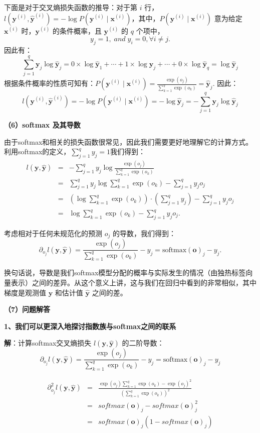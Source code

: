\documentclass[UTF8]{ctexart}
\begin{document}
	下面是对于交叉熵损失函数的推导：对于第 $i$ 行，$ l(\bm{y}^{(i)}, \hat{\bm{y}}^{(i)}) = -\log P(\bm{y}^{(i)} \mid \bm{x}^{(i)}) $，其中，$P(\bm{y}^{(i)} \mid \bm{x}^{(i)})$ 意为给定 $\bm{x}^{(i)}$ 时，$\bm{y}^{(i)}$ 的条件概率，且 $\bm{y}^{(i)}$ 的 $q$ 个项中，
	\[
	y_j=1, \;and \;  y_i=0,\forall i \neq j.
	\]
	因此有：
	\[
	\sum_{j=1}^q \bm{y}_j \log \hat{\bm{y}}_j = 0 \times \log \hat{\bm{y}}_1 + \cdots + 1 \times \log \hat{\bm{y}}_j + \cdots + 0 \times \log \hat{\bm{y}}_q= \log \hat{\bm{y}}_j
	\]
	根据条件概率的性质可知有：$ P(\bm{y}^{(i)} \mid \bm{x}^{(i)}) = \frac{\exp(o_j)}{\sum_{k=1}^q \exp(o_k)} = \hat{\bm{y}}_j$. 因此：
	\[
	l(\bm{y}^{(i)}, \hat{\bm{y}}^{(i)}) = -\log P(\bm{y}^{(i)} \mid \bm{x}^{(i)}) = -\log \hat{\bm{y}}_j = -\sum_{j=1}^q \bm{y}_j \log \hat{\bm{y}}_j
	\]
	
	\textbf{（6）softmax 及其导数}
	
	由于softmax和相关的损失函数很常见，因此我们需要更好地理解它的计算方式。利用softmax的定义，$\sum_{j=1}^q y_j=1$我们得到：
	\begin{eqnarray*}
		l(\bm{y}, \hat{\bm{y}}) &=& -\sum_{j=1}^q y_j \log \frac{\exp(o_j)}{\sum_{k=1}^q \exp(o_k)}\\
		&=& \sum_{j=1}^q y_j \log \sum_{k=1}^q \exp(o_k) - \sum_{j=1}^q y_j o_j\\
		&=& \left(\log \sum_{k=1}^q \exp(o_k) \right) \cdot \left( \sum_{j=1}^q y_j\right) - \sum_{j=1}^q y_j o_j\\
		&=& \log \sum_{k=1}^q \exp(o_k) - \sum_{j=1}^q y_j o_j.
	\end{eqnarray*}
	
	
	考虑相对于任何未规范化的预测 $o_j$ 的导数，我们得到：
	\[
	\partial_{o_j} l(\bm{y}, \hat{\bm{y}}) = \frac{\exp(o_j)}{\sum_{k=1}^q \exp(o_k)} - y_j = \text{softmax}(\bm{o})_j - y_j.
	\]
	
	换句话说，导数是我们softmax模型分配的概率与实际发生的情况（由独热标签向量表示）之间的差异。从这个意义上讲，这与我们在回归中看到的非常相似，其中梯度是观测值 $\bm{y}$ 和估计值 $\hat{\bm{y}}$ 之间的差。
	
	\newpage
	\textbf{（7）问题解答}
	
	\textbf{1、我们可以更深入地探讨指数族与softmax之间的联系}
	
	\noindent \textbf{解}：计算softmax交叉熵损失 $ l(\bm{y}, \hat{\bm{y}}) $ 的二阶导数：
		$$
		\partial_{o_j} l(\bm{y}, \hat{\bm{y}}) = \frac{\exp(o_j)}{\sum_{k=1}^q \exp(o_k)} - y_j = \text{softmax}(\bm{o})_j - y_j
		$$
		
		\begin{eqnarray*}
			\partial_{o_j}^2 l(\bm{y}, \hat{\bm{y}}) &=& \frac{\exp(o_j) \sum_{k=1}^q \exp(o_k) - \exp(o_j)^2}{\left( \sum_{k=1}^q \exp(o_k) \right)^2}\\
			&=& softmax(\bm{o})_j - softmax(\bm{o})_j^2\\
			&=& softmax(\bm{o})_j (1 - softmax(\bm{o})_j)
		\end{eqnarray*}
	
\end{document}
